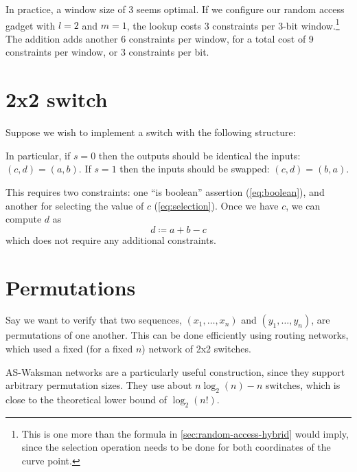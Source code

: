 \documentclass{article}
\begin{document}
In practice, a window size of 3 seems optimal. If we configure our random access gadget with $l = 2$ and $m = 1$, the lookup costs 3 constraints per 3-bit window.\footnote{This is one more than the formula in \autoref{sec:random-access-hybrid} would imply, since the selection operation needs to be done for both coordinates of the curve point.} The addition adds another 6 constraints per window, for a total cost of 9 constraints per window, or $3$ constraints per bit.


\section{2x2 switch}

Suppose we wish to implement a switch with the following structure:
\begin{center}
\end{center}
In particular, if $s = 0$ then the outputs should be identical the inputs: $(c, d) = (a, b)$. If $s = 1$ then the inputs should be swapped: $(c, d) = (b, a)$.

This requires two constraints: one ``is boolean'' assertion (\autoref{eq:boolean}), and another for selecting the value of $c$ (\autoref{eq:selection}). Once we have $c$, we can compute $d$ as
\begin{equation}
  d \coloneqq a + b - c
\end{equation}
which does not require any additional constraints.


\section{Permutations} \label{sec:permutations}

Say we want to verify that two sequences, $(x_1, \dots, x_n)$ and $(y_1, \dots, y_n)$, are permutations of one another. This can be done efficiently using routing networks, which used a fixed (for a fixed $n$) network of 2x2 switches.

AS-Waksman networks \cite{beauquier2002arbitrary} are a particularly useful construction, since they support arbitrary permutation sizes. They use about $n \log_2(n) - n$ switches, which is close to the theoretical lower bound of $\log_2(n!)$.
\end{document}

